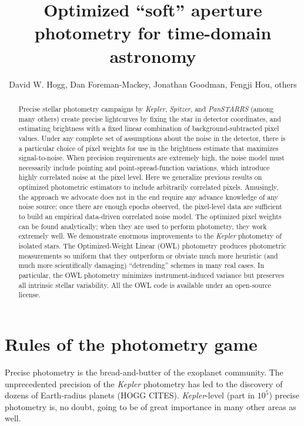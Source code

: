 \documentclass[12pt, letterpaper, preprint]{aastex}
\newcommand{\project}[1]{\textsl{#1}}
\begin{document}
\title{
  Optimized ``soft'' aperture photometry for time-domain astronomy
}
\author{
  David W. Hogg,
  Dan Foreman-Mackey,
  Jonathan Goodman,
  Fengji Hou,
  others
}

\begin{abstract}
Precise stellar photometry campaigns by \project{Kepler}, \project{Spitzer}, and \project{PanSTARRS}
  (among many others)
  create precise lightcurves by fixing the star in detector coordinates,
  and estimating brightness with a fixed linear combination of background-subtracted pixel values.
Under any complete set of assumptions about the noise in the detector,
  there is a particular choice of pixel weights for use in the brightness estimate
  that maximizes signal-to-noise.
When precision requirements are extremely high,
  the noise model must necessarily include pointing and point-spread-function variations,
  which introduce highly correlated noise at the pixel level.
Here we generalize previous results on optimized photometric estimators
  to include arbitrarily correlated pixels.
Amusingly, the approach we advocate does not in the end
  require any advance knowledge of any noise source;
  once there are enough epochs observed,
  the pixel-level data are sufficient to build an empirical data-driven correlated noise model.
The optimized pixel weights can be found analytically;
  when they are used to perform photometry, they work extremely well.
We demonstrate enormous improvements to the \project{Kepler} photometry of isolated stars.
The Optimized-Weight Linear (OWL) photometry produces photometric measurements so uniform that
  they outperform or obviate much more heuristic (and much more scientifically damaging)
  ``detrending'' schemes in many real cases.
In particular, the OWL photometry minimizes instrument-induced variance
  but preserves all intrinsic stellar variability.
All the OWL code is available under an open-source license.
\end{abstract}


\section{Rules of the photometry game}

Precise photometry is the bread-and-butter of the exoplanet community.
The unprecedented precision of the \project{Kepler} photometry has led to the discovery of
dozens of Earth-radius planets (HOGG CITES).
\project{Kepler}-level (part in $10^5$) precise photometry is, no doubt,
  going to be of great importance in many other areas as well.
\end{document}
